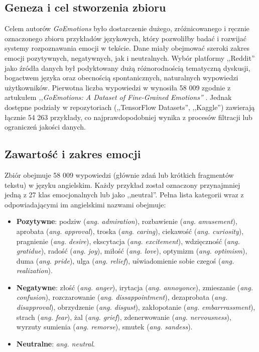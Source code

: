 \documentclass[wmii, inf, mgr]{uwmthesis}
\begin{document}
\subsection{Geneza i cel stworzenia zbioru}
Celem autorów \textit{GoEmotions} było dostarczenie dużego, zróżnicowanego i ręcznie oznaczonego zbioru przykładów językowych, który pozwoliłby badać i rozwijać systemy rozpoznawania emocji w tekście. Dane miały obejmować szeroki zakres emocji pozytywnych, negatywnych, jak i neutralnych. Wybór platformy ,,Reddit'' jako źródła danych był podyktowany dużą różnorodnością tematyczną dyskusji, bogactwem języka oraz obecnością spontanicznych, naturalnych wypowiedzi użytkowników. Pierwotna liczba wypowiedzi w wynosiła 58 009 zgodnie z~ artukułem \textit{,,GoEmotions: A Dataset of Fine-Grained Emotions''} \cite{GoEmotions}. Jednak dostępne podziały w repozytoriach (,,TensorFlow Datasets'', ,,Kaggle'') zawierają łącznie 54 263 przykłady, co najprawdopodobniej wynika z procesów filtracji lub ograniczeń jakości danych.

\subsection{Zawartość i zakres emocji}
Zbiór obejmuje 58 009 wypowiedzi (głównie zdań lub krótkich fragmentów tekstu) w języku angielskim. Każdy przykład został oznaczony przynajmniej jedną z 27 klas emocjonalnych lub jako ,,neutral''. Pełna lista kategorii wraz z odpowiadającymi im angielskimi nazwami obejmuje:

\begin{itemize}
    \item {\textbf{Pozytywne}}: podziw (\textit{ang. admiration}), rozbawienie (\textit{ang. amusement}), aprobata (\textit{ang. approval}), troska (\textit{ang. caring}), ciekawość (\textit{ang. curiosity}), pragnienie (\textit{ang. desire}), ekscytacja (\textit{ang. excitement}), wdzięczność (\textit{ang. gratidue}), radość (\textit{ang. joy}), miłość (\textit{ang. love}), optymizm (\textit{ang. optimism}), duma (\textit{ang. pride}), ulga (\textit{ang. relief}), uświadomienie sobie czegoś (\textit{ang. realization}).
    \item {\textbf{Negatywne}}: złość (\textit{ang. anger}), irytacja (\textit{ang. annoyonce}), zmieszanie (\textit{ang. confusion}), rozczarowanie (\textit{ang. dissappointment}), dezaprobata (\textit{ang. disapproval}), obrzydzenie (\textit{ang. disgust}), zakłopotanie (\textit{ang. embarrrassment}), strach (\textit{ang. fear}), żal (\textit{ang. grief}), zdenerwowanie (\textit{ang. nervousness}), wyrzuty sumienia (\textit{ang. remorse}), smutek (\textit{ang. sandess}).
    \item {\textbf{Neutralne}}: \textit{ang. neutral}.
\end{itemize}
\end{document}

